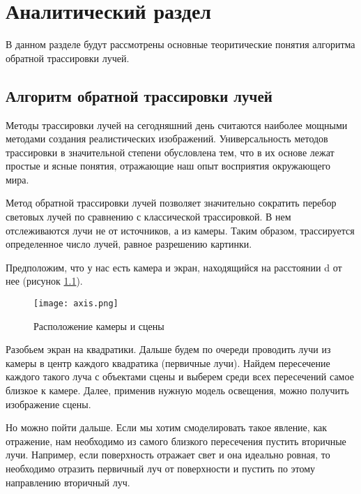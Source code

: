 \chapter{ Аналитический раздел}
\label{cha:analytical}
    В данном разделе будут рассмотрены основные теоритические понятия алгоритма 
    обратной трассировки лучей.

    \section{Алгоритм обратной трассировки лучей}
	Методы трассировки лучей на сегодняшний день считаются наиболее мощными методами создания реалистических изображений. Универсальность методов трассировки в значительной степени обусловлена тем, что в их основе лежат простые и ясные понятия, отражающие наш опыт восприятия окружающего мира.

	Метод обратной трассировки лучей позволяет значительно сократить перебор световых лучей по сравнению с классической трассировкой. В нем отслеживаются лучи не от источников, а из камеры. Таким образом, трассируется определенное число лучей, равное разрешению картинки.

	Предположим, что у нас есть камера и экран, находящийся на расстоянии d от нее (рисунок \ref{png:axis}).

        \begin{figure}[h!]
            \centering
            \texttt{[image: axis.png]}
	 \caption{Расположение камеры и сцены}
            \label{png:axis}
        \end{figure} 

 Разобьем экран на квадратики. Дальше будем по очереди проводить лучи из камеры в центр каждого квадратика (первичные лучи). Найдем пересечение каждого такого луча с объектами сцены и выберем среди всех пересечений самое близкое к камере. Далее, применив нужную модель освещения, можно получить изображение сцены.

	Но можно пойти дальше. Если мы хотим смоделировать такое явление, как отражение, нам необходимо из самого близкого пересечения пустить вторичные лучи. Например, если поверхность отражает свет и она идеально ровная, то необходимо отразить первичный луч от поверхности и пустить по этому направлению вторичный луч. 






\newpage